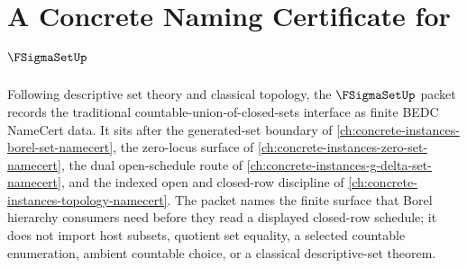 \chapter{A Concrete Naming Certificate for $\FSigmaSetUp$}
\label{ch:concrete-instances-f-sigma-set-namecert}

Following descriptive set theory and classical topology, the $\FSigmaSetUp$ packet records the traditional countable-union-of-closed-sets interface as finite BEDC NameCert data. It sits after the generated-set boundary of \autoref{ch:concrete-instances-borel-set-namecert}, the zero-locus surface of \autoref{ch:concrete-instances-zero-set-namecert}, the dual open-schedule route of \autoref{ch:concrete-instances-g-delta-set-namecert}, and the indexed open and closed-row discipline of \autoref{ch:concrete-instances-topology-namecert}. The packet names the finite surface that Borel hierarchy consumers need before they read a displayed closed-row schedule; it does not import host subsets, quotient set equality, a selected countable enumeration, ambient countable choice, or a classical descriptive-set theorem.

